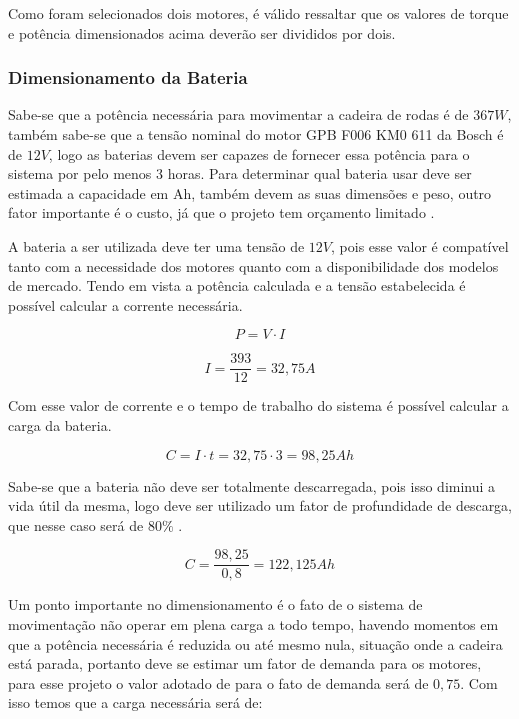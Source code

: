 Como foram selecionados dois motores, é válido ressaltar 
que os valores de torque e potência dimensionados acima deverão ser divididos por dois.


\subsubsection{Dimensionamento da Bateria}

Sabe-se que a potência necessária para movimentar a cadeira de rodas é de $367 W$,
também sabe-se que a tensão nominal do motor GPB F006 KM0 611 da Bosch é de $12V$,
logo as baterias devem ser capazes de fornecer essa potência para o sistema por
pelo menos 3 horas. Para determinar qual bateria usar deve ser estimada a
capacidade em Ah, também devem as suas dimensões e peso, outro fator importante
é o custo, já que o projeto tem orçamento limitado \cite{costa}.

A bateria a ser utilizada deve ter uma tensão de $12V$, pois esse valor é
compatível tanto com a necessidade dos motores quanto com a disponibilidade dos
modelos de mercado. Tendo em vista a potência calculada e a tensão estabelecida
é possível calcular a corrente necessária.

\begin{equation}
P = V \cdot I
\end{equation}

\begin{equation}
I = \frac{393}{12} = 32,75 A
\end{equation}

Com esse valor de corrente e o tempo de trabalho do sistema é possível calcular
a carga da bateria.

\begin{equation}
C = I \cdot t = 32,75 \cdot 3 = 98,25 Ah
\end{equation}

Sabe-se que a bateria não deve ser totalmente descarregada, pois isso diminui a
vida útil da mesma, logo deve ser utilizado um fator de profundidade de descarga,
que nesse caso será de $80\%$ \cite{KARASINSKI}.

\begin{equation}
C = \frac{98,25}{0,8} = 122,125 Ah
\end{equation}

Um ponto importante no dimensionamento é o fato de o sistema de movimentação não
operar em plena carga a todo tempo, havendo momentos em que a potência necessária
é reduzida ou até mesmo nula, situação onde a cadeira está parada, portanto deve
se estimar um fator de demanda para os motores, para esse projeto o valor
adotado de para o fato de demanda será de $0,75$. Com isso temos que a carga
necessária será de:

